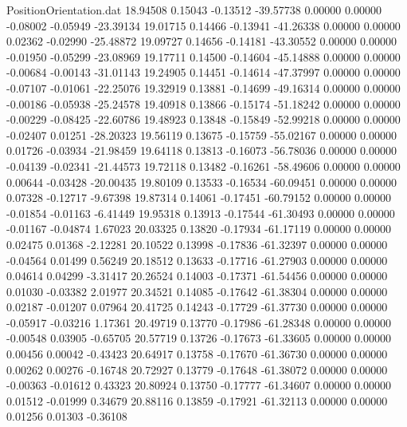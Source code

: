 \begin{filecontents}{PositionOrientation.dat}
  18.94508    0.15043   -0.13512   -39.57738    0.00000    0.00000   -0.08002   -0.05949  -23.39134
  19.01715    0.14466   -0.13941   -41.26338    0.00000    0.00000    0.02362   -0.02990  -25.48872
  19.09727    0.14656   -0.14181   -43.30552    0.00000    0.00000   -0.01950   -0.05299  -23.08969
  19.17711    0.14500   -0.14604   -45.14888    0.00000    0.00000   -0.00684   -0.00143  -31.01143
  19.24905    0.14451   -0.14614   -47.37997    0.00000    0.00000   -0.07107   -0.01061  -22.25076
  19.32919    0.13881   -0.14699   -49.16314    0.00000    0.00000   -0.00186   -0.05938  -25.24578
  19.40918    0.13866   -0.15174   -51.18242    0.00000    0.00000   -0.00229   -0.08425  -22.60786
  19.48923    0.13848   -0.15849   -52.99218    0.00000    0.00000   -0.02407    0.01251  -28.20323
  19.56119    0.13675   -0.15759   -55.02167    0.00000    0.00000    0.01726   -0.03934  -21.98459
  19.64118    0.13813   -0.16073   -56.78036    0.00000    0.00000   -0.04139   -0.02341  -21.44573
  19.72118    0.13482   -0.16261   -58.49606    0.00000    0.00000    0.00644   -0.03428  -20.00435
  19.80109    0.13533   -0.16534   -60.09451    0.00000    0.00000    0.07328   -0.12717   -9.67398
  19.87314    0.14061   -0.17451   -60.79152    0.00000    0.00000   -0.01854   -0.01163   -6.41449
  19.95318    0.13913   -0.17544   -61.30493    0.00000    0.00000   -0.01167   -0.04874    1.67023
  20.03325    0.13820   -0.17934   -61.17119    0.00000    0.00000    0.02475    0.01368   -2.12281
  20.10522    0.13998   -0.17836   -61.32397    0.00000    0.00000   -0.04564    0.01499    0.56249
  20.18512    0.13633   -0.17716   -61.27903    0.00000    0.00000    0.04614    0.04299   -3.31417
  20.26524    0.14003   -0.17371   -61.54456    0.00000    0.00000    0.01030   -0.03382    2.01977
  20.34521    0.14085   -0.17642   -61.38304    0.00000    0.00000    0.02187   -0.01207    0.07964
  20.41725    0.14243   -0.17729   -61.37730    0.00000    0.00000   -0.05917   -0.03216    1.17361
  20.49719    0.13770   -0.17986   -61.28348    0.00000    0.00000   -0.00548    0.03905   -0.65705
  20.57719    0.13726   -0.17673   -61.33605    0.00000    0.00000    0.00456    0.00042   -0.43423
  20.64917    0.13758   -0.17670   -61.36730    0.00000    0.00000    0.00262    0.00276   -0.16748
  20.72927    0.13779   -0.17648   -61.38072    0.00000    0.00000   -0.00363   -0.01612    0.43323
  20.80924    0.13750   -0.17777   -61.34607    0.00000    0.00000    0.01512   -0.01999    0.34679
  20.88116    0.13859   -0.17921   -61.32113    0.00000    0.00000    0.01256    0.01303   -0.36108

\end{filecontents}

